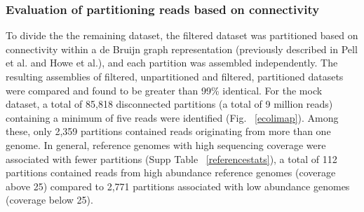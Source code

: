 \documentclass[11pt]{article} %
\begin{document}
\subsubsection{Evaluation of partitioning reads based on connectivity}
To divide the the remaining dataset, the filtered dataset was partitioned based on connectivity within a de Bruijn graph representation (previously described in Pell et al. and Howe et al.), and each partition was assembled independently.  The resulting assemblies of filtered, unpartitioned and filtered, partitioned datasets were compared and found to be greater than 99\% identical.  For the mock dataset, a total of 85,818 disconnected partitions (a total of 9 million reads) containing a minimum of five reads were identified (Fig. ~\ref{ecolimap}).  Among these, only 2,359 partitions contained reads originating from more than one genome.  
In general, reference genomes with high sequencing coverage were associated with fewer partitions (Supp Table ~\ref{referencestats}), a total of 112 partitions contained reads from high abundance reference genomes (coverage above 25) compared to 2,771 partitions associated with low abundance genomes (coverage below 25).   %
\end{document}
